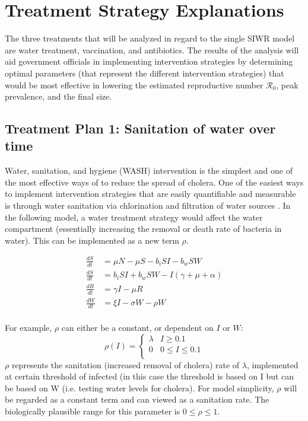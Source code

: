\documentclass[12pt]{article}\usepackage[]{graphicx}\usepackage[]{color}
\begin{document}
\section{Treatment Strategy Explanations}

The three treatments that will be analyzed in regard to the single SIWR model are water treatment, vaccination, and antibiotics.
The results of the analysis will aid government officials in implementing intervention strategies by determining optimal  parameters (that represent the different intervention strategies) that would be most effective in lowering the estimated reproductive number $\mathcal R_0$, peak prevalence, and the final size.
\subsection{Treatment Plan 1: Sanitation of water over time}
Water, sanitation, and hygiene (WASH) intervention is the simplest and one of the most effective ways of to reduce the spread of cholera.
One of the easiest ways to implement intervention strategies that are easily quantifiable and measurable is through water sanitation via chlorination and filtration of water sources \citep{link26}.
In the following model, a water treatment strategy would affect the water compartment (essentially increasing the removal or death rate of bacteria in water).
This can be implemented as a new term $\rho$. \par

\begin{align*}
	\frac{dS}{dt}&= \mu N - \mu S - b_i SI - b_w S W  \\
	\frac{dS}{dt}&= b_i S I + b_w S W - I (\gamma + \mu + \alpha) \\
	\frac{dR}{dt}&= \gamma I - \mu R \\
	\frac{dW}{dt}&= \xi I  - \sigma W - \rho W\\
\end{align*}

For example, $\rho$ can either be a constant, or dependent on $I$ or $W$:\\
$$\rho (I)= \begin{cases}
			 			\lambda & I \geq 0.1 \\
			 			0 & 0 \leq I \leq 0.1 \\
			 			\end{cases}$$
$\rho$ represents the sanitation (increased removal of cholera) rate of $\lambda$, implemented at certain threshold of infected (in this case the threshold is based on I but can be based on W (i.e. testing water levels for cholera).
For model simplicity, $\rho$ will be regarded as a constant term and can viewed as a sanitation rate. The biologically plausible range for this parameter is $0 \leq \rho \leq 1$.\\
\end{document}

